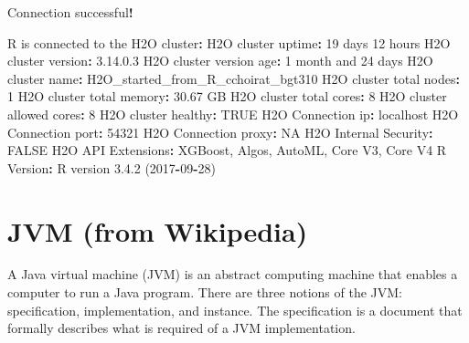 \documentclass[]{book}
\newenvironment{Shaded}{\begin{snugshade}}{\end{snugshade}}
\newcommand{\DecValTok}[1]{\textcolor[rgb]{0.00,0.00,0.81}{#1}}
\newcommand{\FloatTok}[1]{\textcolor[rgb]{0.00,0.00,0.81}{#1}}
\newcommand{\StringTok}[1]{\textcolor[rgb]{0.31,0.60,0.02}{#1}}
\newcommand{\OtherTok}[1]{\textcolor[rgb]{0.56,0.35,0.01}{#1}}
\newcommand{\OperatorTok}[1]{\textcolor[rgb]{0.81,0.36,0.00}{\textbf{#1}}}
\newcommand{\NormalTok}[1]{#1}
\theoremstyle{definition}
\theoremstyle{definition}
\theoremstyle{definition}
\theoremstyle{remark}
\begin{document}
\begin{Shaded}
\begin{Highlighting}[]
\NormalTok{ Connection successful}\OperatorTok{!}

\NormalTok{R is connected to the H2O cluster}\OperatorTok{:}\StringTok{ }
\StringTok{    }\NormalTok{H2O cluster uptime}\OperatorTok{:}\StringTok{         }\DecValTok{19}\NormalTok{ days }\DecValTok{12}\NormalTok{ hours }
\NormalTok{    H2O cluster version}\OperatorTok{:}\StringTok{        }\FloatTok{3.14}\NormalTok{.}\FloatTok{0.3} 
\NormalTok{    H2O cluster version age}\OperatorTok{:}\StringTok{    }\DecValTok{1}\NormalTok{ month and }\DecValTok{24}\NormalTok{ days  }
\NormalTok{    H2O cluster name}\OperatorTok{:}\StringTok{           }\NormalTok{H2O_started_from_R_cchoirat_bgt310 }
\NormalTok{    H2O cluster total nodes}\OperatorTok{:}\StringTok{    }\DecValTok{1} 
\NormalTok{    H2O cluster total memory}\OperatorTok{:}\StringTok{   }\FloatTok{30.67}\NormalTok{ GB }
\NormalTok{    H2O cluster total cores}\OperatorTok{:}\StringTok{    }\DecValTok{8} 
\NormalTok{    H2O cluster allowed cores}\OperatorTok{:}\StringTok{  }\DecValTok{8} 
\NormalTok{    H2O cluster healthy}\OperatorTok{:}\StringTok{        }\OtherTok{TRUE} 
\NormalTok{    H2O Connection ip}\OperatorTok{:}\StringTok{          }\NormalTok{localhost }
\NormalTok{    H2O Connection port}\OperatorTok{:}\StringTok{        }\DecValTok{54321} 
\NormalTok{    H2O Connection proxy}\OperatorTok{:}\StringTok{       }\OtherTok{NA} 
\NormalTok{    H2O Internal Security}\OperatorTok{:}\StringTok{      }\OtherTok{FALSE} 
\NormalTok{    H2O API Extensions}\OperatorTok{:}\StringTok{         }\NormalTok{XGBoost, Algos, AutoML, Core V3, Core V4 }
\NormalTok{    R Version}\OperatorTok{:}\StringTok{                  }\NormalTok{R version }\FloatTok{3.4}\NormalTok{.}\DecValTok{2}\NormalTok{ (}\DecValTok{2017}\OperatorTok{-}\DecValTok{09}\OperatorTok{-}\DecValTok{28}\NormalTok{) }
\end{Highlighting}
\end{Shaded}

\section{JVM (from Wikipedia)}\label{jvm-from-wikipedia}

A Java virtual machine (JVM) is an abstract computing machine that
enables a computer to run a Java program. There are three notions of the
JVM: specification, implementation, and instance. The specification is a
document that formally describes what is required of a JVM
implementation.
\end{document}
